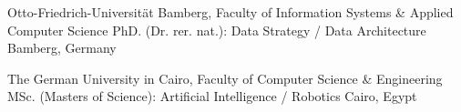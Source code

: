 \begin{cventries}



  \cventry
    {Otto-Friedrich-Universit\"{a}t Bamberg, Faculty of Information Systems \& Applied Computer Science}  %
    {PhD. (Dr. rer. nat.): Data Strategy / Data Architecture} %
    {}%
    {Bamberg, Germany} %
    {	
    }


\vspace{-1ex}


  \cventry
    {The German University in Cairo, Faculty of Computer Science \& Engineering}  %
    {MSc. (Masters of Science): Artificial Intelligence / Robotics} %
    {}%
    {Cairo, Egypt} %
    {	
    }
    

\end{cventries}
